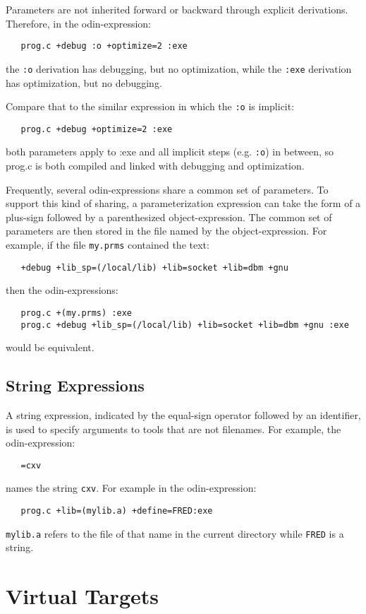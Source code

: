 \documentclass[hidelinks]{report}
\newcommand{\ex}{\tt}   %
\begin{document}
Parameters are not inherited forward or backward through explicit derivations.
Therefore, in the odin-expression:
\begin{verbatim}
   prog.c +debug :o +optimize=2 :exe
\end{verbatim}
the {\ex :o} derivation has debugging, but no optimization,
while the {\ex :exe} derivation has optimization, but no debugging.

Compare that to the similar expression in which the {\ex :o} is implicit:
\begin{verbatim}
   prog.c +debug +optimize=2 :exe
\end{verbatim}
both parameters apply to :exe and all implicit steps (e.g. {\ex :o}) in
between, so prog.c is both compiled and linked with debugging and
optimization.

Frequently, several odin-expressions share a common set of parameters.
To support this kind of sharing,
a parameterization expression can take the form of
a plus-sign followed by a parenthesized object-expression.
The common set of parameters are then stored in the file
named by the object-expression.
For example, if the file {\ex my.prms} contained the text:
\begin{verbatim}
   +debug +lib_sp=(/local/lib) +lib=socket +lib=dbm +gnu
\end{verbatim}
then the odin-expressions:
\begin{verbatim}
   prog.c +(my.prms) :exe
   prog.c +debug +lib_sp=(/local/lib) +lib=socket +lib=dbm +gnu :exe
\end{verbatim}
would be equivalent.

\subsection{String Expressions}

A string expression, indicated by the equal-sign operator
followed by an identifier,
is used to specify arguments to tools that are not filenames.
For example, the odin-expression:
\begin{verbatim}
   =cxv
\end{verbatim}
names the string {\ex cxv}. For example in the odin-expression:
\begin{verbatim}
   prog.c +lib=(mylib.a) +define=FRED:exe
\end{verbatim}
{\ex mylib.a} refers to the file of that name in the current directory while
{\ex FRED} is a string.

\section{Virtual Targets}
\label{virtualtarget}
\end{document}
